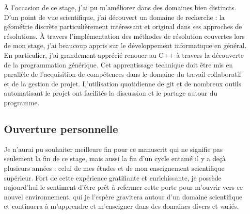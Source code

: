 À l'occasion de ce stage, j'ai pu m'améliorer dans des domaines bien distincts. D'un point de vue scientifique, j'ai découvert un domaine de recherche : la géométrie discrète particulièrement intéressant et original dans ses approches de résolutions. À travers l'implémentation des méthodes de résolution couvertes lors de mon stage, j'ai beaucoup appris sur le développement informatique en général. En particulier, j'ai grandement apprécié renouer au C++ à travers la découverte de la programmation générique. Cet apprentissage technique doit être mis en parallèle de l’acquisition de compétences dans le domaine du travail collaboratif et de la gestion de projet. L'utilisation quotidienne de git et de nombreux outils automatisant le projet ont facilités la discussion et le partage autour du programme.

\subsection{Ouverture personnelle}

Je n'aurai pu souhaiter meilleure fin pour ce manuscrit qui ne signifie pas seulement la fin de ce stage, mais aussi la fin d'un cycle entamé il y a deçà plusieurs années : celui de mes études et de mon enseignement scientifique supérieur. Fort de cette expérience gratifiante et enrichissante, je possède aujourd'hui le sentiment d'être prêt à refermer cette porte pour m'ouvrir vers ce nouvel environnement, qui je l'espère gravitera autour d'un domaine scientifique et continuera à m'apprendre et m'enseigner dans des domaines divers et variés.

